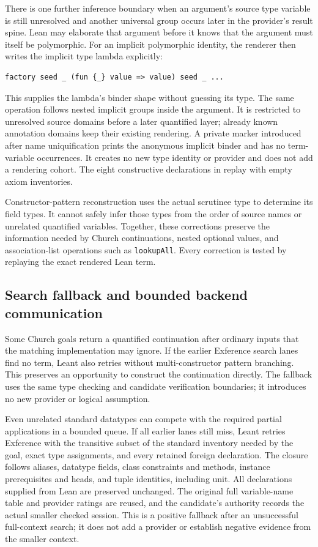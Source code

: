 \documentclass[11pt]{article}
\newcommand{\code}[1]{\texttt{#1}}
\begin{document}
There is one further inference boundary when an argument's source type
variable is still unresolved and another universal group occurs later in the
provider's result spine. Lean may elaborate that argument before it knows
that the argument must itself be polymorphic. For an implicit polymorphic
identity, the renderer then writes the implicit type lambda explicitly:
\begin{lstlisting}
factory seed _ (fun {_} value => value) seed _ ...
\end{lstlisting}
This supplies the lambda's binder shape without guessing its type. The same
operation follows nested implicit groups inside the argument. It is restricted
to unresolved source domains before a later quantified layer; already known
annotation domains keep their existing rendering. A private marker introduced
after name uniquification prints the anonymous implicit binder and has no
term-variable occurrences. It creates no new type identity or provider and
does not add a rendering cohort. The eight constructive declarations in
 replay with empty axiom inventories.

Constructor-pattern reconstruction uses the actual scrutinee type to determine
its field types. It cannot safely infer those types from the order of source
names or unrelated quantified variables. Together, these corrections preserve
the information needed by Church continuations, nested optional values, and
association-list operations such as \code{lookupAll}. Every correction is
tested by replaying the exact rendered Lean term.

\subsection{Search fallback and bounded backend communication}

Some Church goals return a quantified continuation after ordinary inputs that
the matching implementation may ignore. If the earlier Exference search lanes
find no term, Leant also retries without multi-constructor pattern branching.
This preserves an opportunity to construct the continuation directly. The
fallback uses the same type checking and candidate verification boundaries;
it introduces no new provider or logical assumption.

Even unrelated standard datatypes can compete with the required partial
applications in a bounded queue. If all earlier lanes still miss, Leant
retries Exference with the transitive subset of the standard inventory needed
by the goal, exact type assignments, and every retained foreign declaration.
The closure follows aliases, datatype fields, class constraints and methods,
instance prerequisites and heads, and tuple identities, including unit.
All declarations supplied from Lean are preserved unchanged. The original
full variable-name table and provider ratings are reused, and the candidate's
authority records the actual smaller checked session. This is a positive
fallback after an unsuccessful full-context search; it does not add a
provider or establish negative evidence from the smaller context.
\end{document}
